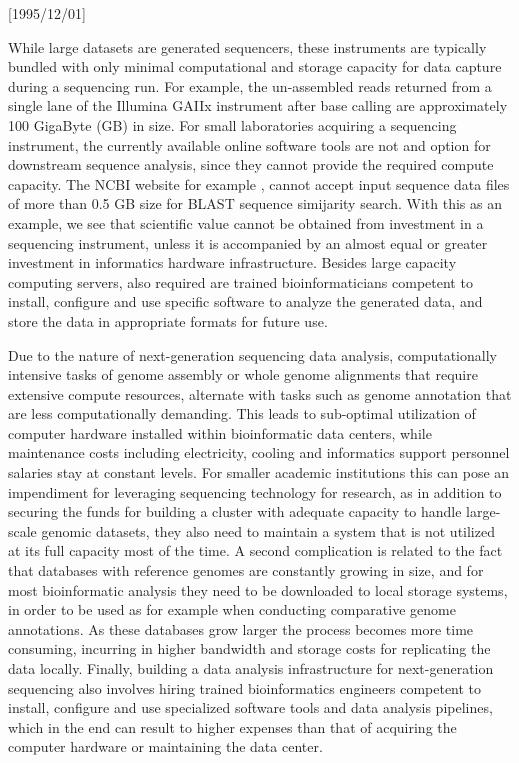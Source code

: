 \NeedsTeXFormat{LaTeX2e}[1995/12/01] \documentclass[10pt]{bmc_article}
\newenvironment{bmcformat}{\begin{raggedright}\baselineskip20pt\sloppy\setboolean{publ}{false}}{\end{raggedright}\baselineskip20pt\sloppy}
\begin{document}
\begin{bmcformat}
While large datasets are generated sequencers, these instruments are typically bundled with only minimal
computational and storage capacity for data capture during a sequencing run.  For example, the un-assembled reads
returned from a single lane of the Illumina GAIIx instrument after base calling are approximately 100 GigaByte
(GB) in size. For small laboratories acquiring a sequencing instrument, the currently available online software tools are
not and option for downstream sequence analysis, since they cannot provide the required compute capacity. The
NCBI website for example \cite{johnson2008ncbi}, cannot accept input sequence data files of more than 0.5 GB
size for BLAST sequence simijarity search. With this as an example, we see that scientific value cannot be
obtained from investment in a sequencing instrument, unless it is accompanied by an almost equal or greater
investment in informatics hardware infrastructure. Besides large capacity computing servers, also required are
trained bioinformaticians competent to install, configure and use specific software to analyze the generated
data, and store the data in appropriate formats for future use.  \pb

Due to the nature of next-generation sequencing data analysis, computationally intensive tasks of genome
assembly or whole genome alignments that require extensive compute resources, alternate with tasks such as 
genome annotation that are less computationally demanding. This leads to sub-optimal utilization of computer 
hardware installed within bioinformatic data centers, while maintenance costs including electricity, cooling and
informatics support personnel salaries stay at constant levels. For smaller academic institutions this can pose an
impendiment for leveraging sequencing technology for research, as in addition to securing the funds for building 
a cluster with adequate capacity to handle large-scale genomic datasets, they also need to maintain a system 
that is not utilized at its full capacity most of the time.  A second complication is related to the fact that 
databases with reference genomes \cite{Pruitt2009} are constantly growing in size, and for most bioinformatic analysis they need 
to be downloaded to local storage systems, in order to be used as for example when conducting comparative 
genome annotations. As these databases grow larger the process becomes more time consuming, incurring in higher 
bandwidth and storage costs for replicating the data locally.  Finally, building a data analysis infrastructure 
for next-generation sequencing also involves hiring trained bioinformatics engineers competent to install, 
configure and use specialized software tools and data analysis pipelines, which in the end can result to 
higher expenses than that of acquiring the computer hardware or maintaining the data center. \pb




\end{bmcformat}
\end{document}
